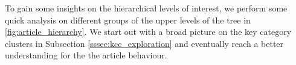 

To gain some insights on the hierarchical levels of interest, we perform some quick analysis on different groups of the upper levels of the tree in \autoref{fig:article_hierarchy}. We start out with a broad picture on the key category clusters in Subsection \ref{sssec:kcc_exploration} and eventually reach a better understanding for the the article behaviour.\\
